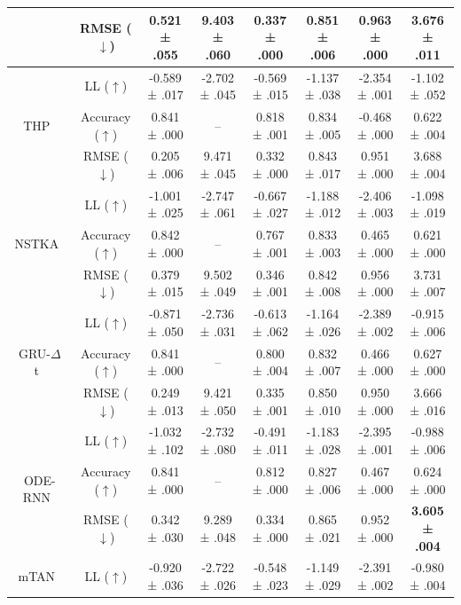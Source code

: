 \documentclass{article}
\begin{document}
\begin{table}[t]
{\begin{tabular}{cccccccc}
        ~ & RMSE ($\downarrow$) & 0.521 ± .055 & 9.403 ± .060 & 0.337 ± .000 & 0.851 ± .006 & 0.963 ± .000 & 3.676 ± .011 \\ 
    \midrule
        \multirow{3}{*}{THP~\cite{zuo2020transformer}} & LL ($\uparrow$) & -0.589 ± .017 & -2.702 ± .045 & -0.569 ± .015 & -1.137 ± .038 & -2.354 ± .001 & -1.102 ± .052 \\ 
        ~ & Accuracy ($\uparrow$) & 0.841 ± .000 & -- & 0.818 ± .001 & 0.834 ± .005 & -0.468 ± .000 & 0.622 ± .004 \\ 
        ~ & RMSE ($\downarrow$) & 0.205 ± .006 & 9.471 ± .045 & 0.332 ± .000 & 0.843 ± .017 & 0.951 ± .000 & 3.688 ± .004 \\ 
    \midrule
        \multirow{3}{*}{NSTKA~\cite{ma2022non}} & LL ($\uparrow$) & -1.001 ± .025 & -2.747 ± .061 & -0.667 ± .027 & -1.188 ± .012 & -2.406 ± .003 & -1.098 ± .019 \\ 
        ~ & Accuracy ($\uparrow$) & 0.842 ± .000 & -- & 0.767 ± .001 & 0.833 ± .003 & 0.465 ± .000 & 0.621 ± .000 \\ 
        ~ & RMSE ($\downarrow$) & 0.379 ± .015 & 9.502 ± .049 & 0.346 ± .001 & 0.842 ± .008 & 0.956 ± .000 & 3.731 ± .007 \\ 
    \midrule
        \multirow{3}{*}{GRU-$\Delta$t~\cite{chen2018neural}} & LL ($\uparrow$) & -0.871 ± .050 & -2.736 ± .031 & -0.613 ± .062 & -1.164 ± .026 & -2.389 ± .002 & -0.915 ± .006 \\
        ~ & Accuracy ($\uparrow$) & 0.841 ± .000 & -- & 0.800 ± .004 & 0.832 ± .007 & 0.466 ± .000 & 0.627 ± .000 \\ 
        ~ & RMSE ($\downarrow$) & 0.249 ± .013 & 9.421 ± .050 & 0.335 ± .001 & 0.850 ± .010 & 0.950 ± .000 & 3.666 ± .016 \\
    \midrule
        \multirow{3}{*}{ODE-RNN~\cite{rubanova2019latent}} & LL ($\uparrow$) & -1.032 ± .102 & -2.732 ± .080 & -0.491 ± .011 & -1.183 ± .028 & -2.395 ± .001 & -0.988 ± .006 \\ 
        ~ & Accuracy ($\uparrow$) & 0.841 ± .000 & -- & 0.812 ± .000 & 0.827 ± .006 & 0.467 ± .000 & 0.624 ± .000 \\ 
        ~ & RMSE ($\downarrow$) & 0.342 ± .030 & 9.289 ± .048 & 0.334 ± .000 & 0.865 ± .021 & 0.952 ± .000 & \textbf{3.605 ± .004} \\ 
    \midrule
        \multirow{3}{*}{mTAN~\cite{shukla2021multi}} & LL ($\uparrow$) & -0.920 ± .036 & -2.722 ± .026 & -0.548 ± .023 & -1.149 ± .029 & -2.391 ± .002 & -0.980 ± .004 \\

\end{tabular}}
\end{table}
\end{document}
